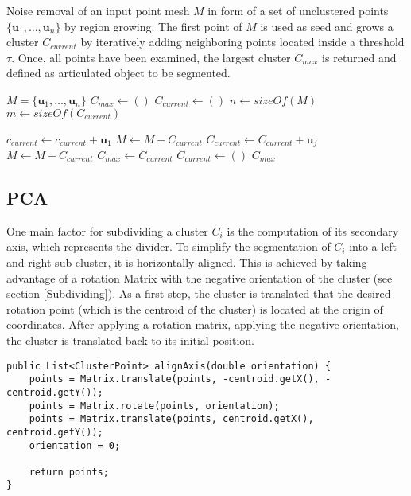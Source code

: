 \begin{algorithm}[tbp]
	\label{alg:noiseRemoval}
	\caption{Noise removal of an input point mesh $M$ in form of a set of unclustered points $\{\boldsymbol{u}_1,\ldots,\boldsymbol{u}_n\}$ by region growing. The first point of $M$ is used as seed and grows a cluster $C_{current}$ by iteratively adding neighboring points located inside a threshold $\tau$. Once, all points have been examined, the largest cluster $C_{max}$ is returned and defined as articulated object to be segmented.}
	
	\begin{algorithmic}[1]     %
		\State $M = \{\boldsymbol{u}_1,\ldots,\boldsymbol{u}_n\}$
		\State $\mathit{C_{max}} \gets ()$
		\State $\mathit{C_{current}} \gets ()$
		\State $n \gets \mathit{sizeOf}(M)$
		\State $m \gets \mathit{sizeOf}(C_{current})$
		
		\State $\mathit{c_{current}} \gets \mathit{c_{current}} + \boldsymbol{u}_1$
		\State $M \gets M - C_{current}$
		\State $C_{current} \gets C_{current} + \boldsymbol{u}_j$
		\EndIf
		\EndFor
		\EndFor
		\State $M \gets M - C_{current}$
		\State $C_{max} \gets C_{current}$
		\EndIf
		\State $C_{current} \gets ()$
		\EndWhile
		\State\Return $C_{max}$
		\EndProcedure	
	\end{algorithmic}
\end{algorithm}
\subsection{PCA}
One main factor for subdividing a cluster $C_i$ is the computation of its secondary axis, which represents the divider. To simplify the segmentation of $C_i$ into a left and right sub cluster, it is horizontally aligned. This is achieved by taking advantage of a rotation Matrix with the negative orientation of the cluster (see section \ref{Subdividing}). As a first step, the cluster is translated that the desired rotation point (which is the centroid of the cluster) is located at the origin of coordinates. After applying a rotation matrix, applying the negative orientation, the cluster is translated back to its initial position.

\begin{lstlisting}
public List<ClusterPoint> alignAxis(double orientation) {
	points = Matrix.translate(points, -centroid.getX(), -centroid.getY());
	points = Matrix.rotate(points, orientation);
	points = Matrix.translate(points, centroid.getX(), centroid.getY());
	orientation = 0;
	
	return points;
}
\end{lstlisting}

